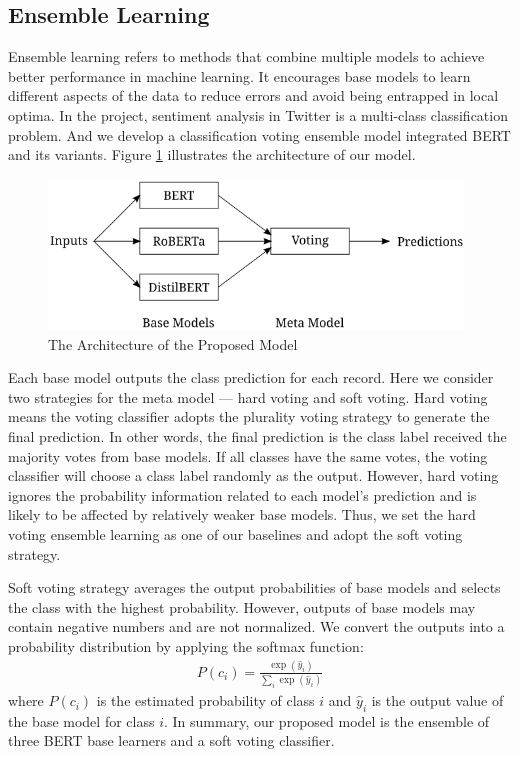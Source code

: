 \documentclass[runningheads]{llncs}
\begin{document}
\subsection{Ensemble Learning}
Ensemble learning refers to methods that combine multiple models to achieve better performance in machine learning. It encourages base models to learn different aspects of the data to reduce errors and avoid being entrapped in local optima. In the project, sentiment analysis in Twitter is a multi-class classification problem. And we develop a classification voting ensemble model integrated BERT and its variants. Figure \ref{fig:model} illustrates the architecture of our model.

\begin{figure}[!ht]
    \centering
    \includegraphics[width=11cm]{./figs/model.png}
    \caption{The Architecture of the Proposed Model}
    \label{fig:model}
\end{figure}

Each base model outputs the class prediction for each record. Here we consider two strategies for the meta model --- hard voting and soft voting. Hard voting means the voting classifier adopts the plurality voting strategy to generate the final prediction. In other words, the final prediction is the class label received the majority votes from base models. If all classes have the same votes, the voting classifier will choose a class label randomly as the output. However, hard voting ignores the probability information related to each model's prediction and is likely to be affected by relatively weaker base models. Thus, we set the hard voting ensemble learning as one of our baselines and adopt the soft voting strategy.

Soft voting strategy averages the output probabilities of base models and selects the class with the highest probability. However, outputs of base models may contain negative numbers and are not normalized. We convert the outputs into a probability distribution by applying the softmax function:
\begin{align*}
    P(c_i) = \frac{\exp{(\hat{y}_i)}}{\sum_i \exp{(\hat{y}_i)}}
\end{align*}
where $P(c_i)$ is the estimated probability of class $i$ and $\hat{y}_i$ is the output value of the base model for class $i$. In summary, our proposed model is the ensemble of three BERT base learners and a soft voting classifier.
\end{document}
